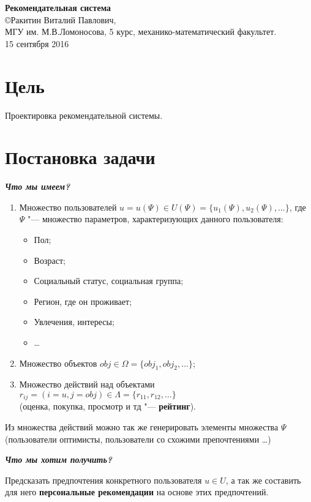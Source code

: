 \documentclass[a4paper,14pt]{article}
\begin{document}
\begin{center}
{\LARGE \bf Рекомендательная система \\}
{\Large \copyright Ракитин Виталий Павлович, \\}
{\Large МГУ им. М.В.Ломоносова, 5 курс, механико-математический факультет.\\
15 сентября 2016\\}
\end{center}
\tableofcontents
\section{Цель }
Проектировка рекомендательной системы.

\section{Постановка задачи }
{\it \bf Что мы имеем?}
\begin{enumerate}
\item Множество пользователей $u = u(\Psi) \in U(\Psi)= \{u_1(\Psi),u_2(\Psi),\dots\}$, где $\Psi$ "--- множество параметров, характеризующих данного пользователя:
\begin{itemize}
\item Пол;
\item Возраст;
\item Социальный статус, социальная группа;
\item Регион, где он проживает;
\item Увлечения, интересы;
\item \dots
\end{itemize}
\item Множество объектов  $obj \in \Omega = \{obj_1,obj_2,\dots\}$;
\item Множество действий над объектами $ r_{ij} = (i = u, j = obj) \in \Lambda = \{r_{11}, r_{12}, \dots\}$\\ (оценка, покупка, просмотр и тд "--- {\bf рейтинг}).
\end{enumerate} 
\begin{Zam} 
Из множества действий можно так же генерировать элементы множества $\Psi$\\ (пользователи оптимисты, пользователи со схожими препочтениями \dots)
\end{Zam}

{\it \bf Что мы хотим получить?}

Предсказать предпочтения конкретного пользователя $u \in U$, а так же составить для него {\bf персональные рекомендации} на основе этих предпочтений.
\end{document}

